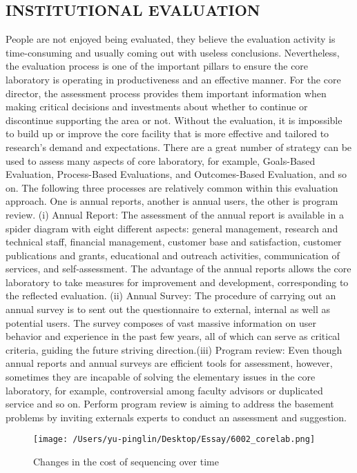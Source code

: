\documentclass[12pt]{article}
\begin{document}
\subsection{INSTITUTIONAL EVALUATION}
People are not enjoyed being evaluated, they believe the evaluation activity is time-consuming and usually coming out with useless conclusions. Nevertheless, the evaluation process is one of the important pillars to ensure the core laboratory is operating in productiveness and an effective manner. For the core director, the assessment process provides them important information when making critical decisions and investments about whether to continue or discontinue supporting the area or not. Without the evaluation, it is impossible to build up or improve the core facility that is more effective and tailored to research's demand and expectations. There are a great number of strategy can be used to assess many aspects of core laboratory, for example, Goals-Based Evaluation, Process-Based Evaluations, and Outcomes-Based Evaluation, and so on. The following three processes are relatively common within this evaluation approach. One is annual reports, another is annual users, the other is program review. (i) Annual Report:
The assessment of the annual report is available in a spider diagram with eight different aspects: general management, research and technical staff, financial management, customer base and satisfaction, customer publications and grants, educational and outreach activities, communication of services, and self-assessment. The advantage of the annual reports allows the core laboratory to take measures for improvement and development, corresponding to the reflected evaluation. (ii) Annual Survey: The procedure of carrying out an annual survey is to sent out the questionnaire to external, internal as well as potential users. The survey composes of vast massive information on user behavior and experience in the past few years, all of which can serve as critical criteria, guiding the future striving direction.(iii) Program review: Even though annual reports and annual surveys are efficient tools for assessment, however, sometimes they are incapable of solving the elementary issues in the core laboratory, for example, controversial among faculty advisors or duplicated service and so on. Perform program review is aiming to address the basement problems by inviting externals experts to conduct an assessment and suggestion.


\begin{figure}[H]
    \texttt{[image: /Users/yu-pinglin/Desktop/Essay/6002\_corelab.png]}
    \centering
    \caption{Changes in the cost of sequencing over time}
\end{figure}
\end{document}
